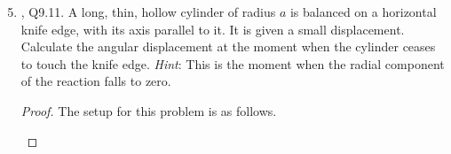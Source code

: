 \documentclass[../psets.tex]{subfiles}
\begin{document}
\begin{enumerate}
    \setcounter{enumi}{4}
    \item \textcite{bib:KibbleBerkshire}, Q9.11. A long, thin, hollow cylinder of radius $a$ is balanced on a horizontal knife edge, with its axis parallel to it. It is given a small displacement. Calculate the angular displacement at the moment when the cylinder ceases to touch the knife edge. \emph{Hint}: This is the moment when the radial component of the reaction falls to zero.
    \begin{proof}
        The setup for this problem is as follows.
        \begin{center}
\end{center}
\end{proof}
\end{enumerate}
\end{document}
